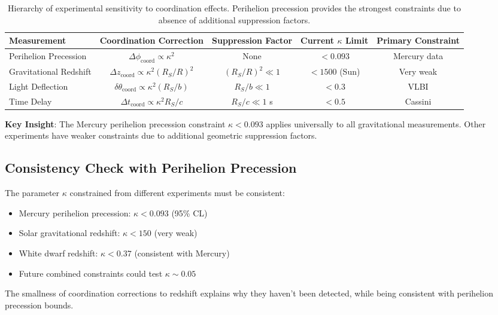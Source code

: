 \documentclass[11pt,a4paper]{article}
\begin{document}
	\begin{table}[htbp]
		\centering
		\small
		\begin{tabular}{lcccc}
			\toprule
			\textbf{Measurement} & \textbf{Coordination Correction} & \textbf{Suppression Factor} & \textbf{Current $\kappa$ Limit} & \textbf{Primary Constraint} \\
			\midrule
Perihelion Precession & $\Delta\phi_{\text{coord}} \propto \kappa^2$ & None & $<0.093$ & Mercury data \\
			Gravitational Redshift & $\Delta z_{\text{coord}} \propto \kappa^2(R_S/R)^2$ & $(R_S/R)^2 \ll 1$ & $<1500$ (Sun) & Very weak \\
			Light Deflection & $\delta\theta_{\text{coord}} \propto \kappa^2(R_S/b)$ & $R_S/b \ll 1$ & $<0.3$ & VLBI \\
			Time Delay & $\Delta t_{\text{coord}} \propto \kappa^2 R_S/c$ & $R_S/c \ll 1$ s & $<0.5$ & Cassini \\
			\bottomrule
		\end{tabular}
		\caption{Hierarchy of experimental sensitivity to coordination effects. Perihelion precession provides the strongest constraints due to absence of additional suppression factors.}
		\label{tab:sensitivity-hierarchy}
	\end{table}
	
	\textbf{Key Insight}: The Mercury perihelion precession constraint $\kappa < 0.093$ applies universally to all gravitational measurements. Other experiments have weaker constraints due to additional geometric suppression factors.
	\subsection{Consistency Check with Perihelion Precession}
	
	The parameter $\kappa$ constrained from different experiments must be consistent:
	\begin{itemize}
		\item Mercury perihelion precession: $\kappa < 0.093$ (95\% CL)
		\item Solar gravitational redshift: $\kappa < 150$ (very weak)
		\item White dwarf redshift: $\kappa < 0.37$ (consistent with Mercury)
		\item Future combined constraints could test $\kappa \sim 0.05$
	\end{itemize}
	
	The smallness of coordination corrections to redshift explains why they haven't been detected, while being consistent with perihelion precession bounds.
	
\end{document}
